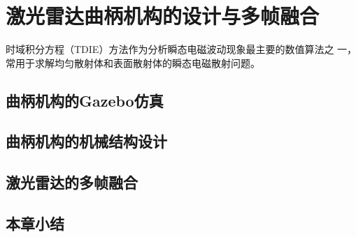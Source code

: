 
\chapter{激光雷达曲柄机构的设计与多帧融合}
时域积分方程（TDIE）方法作为分析瞬态电磁波动现象最主要的数值算法之
一，常用于求解均匀散射体和表面散射体的瞬态电磁散射问题。
\section{曲柄机构的Gazebo仿真}
\section{曲柄机构的机械结构设计}
\section{激光雷达的多帧融合}
\section{本章小结}